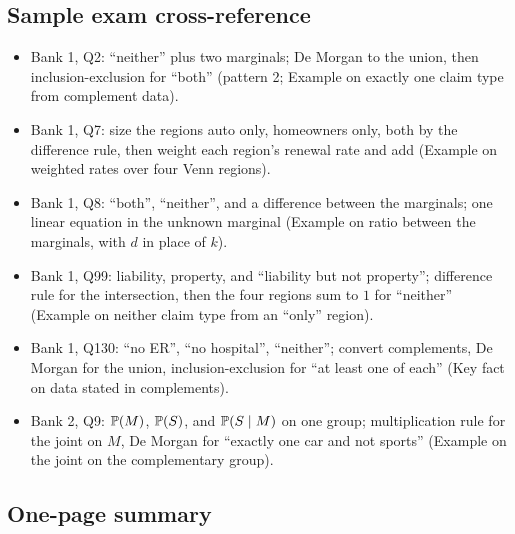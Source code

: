 \subsection{Sample exam cross-reference}

\begin{itemize}[leftmargin=2em]
  \item Bank 1, Q2: ``neither'' plus two marginals; De Morgan to the union, then inclusion-exclusion
  for ``both'' (pattern 2; Example on exactly one claim type from complement data).
  \item Bank 1, Q7: size the regions auto only, homeowners only, both by the difference rule, then
  weight each region's renewal rate and add (Example on weighted rates over four Venn regions).
  \item Bank 1, Q8: ``both'', ``neither'', and a difference between the marginals; one linear
  equation in the unknown marginal (Example on ratio between the marginals, with $d$ in place of $k$).
  \item Bank 1, Q99: liability, property, and ``liability but not property''; difference rule for
  the intersection, then the four regions sum to $1$ for ``neither'' (Example on neither claim type
  from an ``only'' region).
  \item Bank 1, Q130: ``no ER'', ``no hospital'', ``neither''; convert complements, De Morgan for the
  union, inclusion-exclusion for ``at least one of each'' (Key fact on data stated in complements).
  \item Bank 2, Q9: $\mathbb{P}(M)$, $\mathbb{P}(S)$, and $\mathbb{P}(S \mid M)$ on one group; multiplication rule
  for the joint on $M$, De Morgan for ``exactly one car and not sports'' (Example on the joint on the
  complementary group).
\end{itemize}

\subsection{One-page summary}

